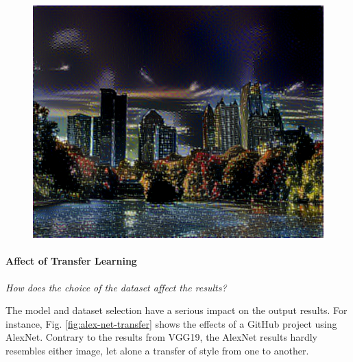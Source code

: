 \documentclass{article}
\begin{document}
\begin{figure}[htp]
    \begin{minipage}{0.3\linewidth}
    \includegraphics[width=\textwidth]{img/photo-transfer/x}
    \end{minipage}
\end{figure}


\paragraph{Affect of Transfer Learning} \textit{How does the choice of the
dataset affect the results?}


The model and dataset selection have a serious impact on the output results.
For instance, Fig. \ref{fig:alex-net-transfer} shows the effects of a GitHub
project using AlexNet. Contrary to the results from VGG19, the AlexNet results
hardly resembles either image, let alone a transfer of style from one to
another.
\end{document}
